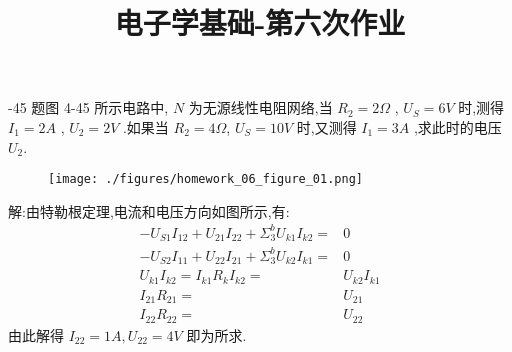 
\usepackage{../../homeworks_preamble}
\title{电子学基础-第六次作业}


    -45 题图 4-45 所示电路中, $N$ 为无源线性电阻网络,当 $R_2=2\Omega$ , $U_{S}=6V$ 时,测得 $I_{1}=2A$ , $U_2=2V$ .如果当 $R_2=4\Omega$, $U_{S}=10V$ 时,又测得 $I_1 = 3A$ ,求此时的电压 $U_2$.
    \begin{figure}[htbp]
        \centering
        \texttt{[image: ./figures/homework\_06\_figure\_01.png]}
    \end{figure}

    解:由特勒根定理,电流和电压方向如图所示,有:
    \begin{align}
        -U_{S 1}I_{12}+U_{21}I_{22}+\Sigma_{3}^{b}U_{k 1}I_{k 2}=&0\nonumber\\
        -U_{S 2}I_{11}+U_{22}I_{21}+\Sigma_{3}^{b}U_{k 2}I_{k 1}=&0\nonumber\\
        U_{k 1}I_{k 2}=I_{k 1}R_{k}I_{k 2}=&U_{k 2}I_{k 1}\nonumber\\
        I_{21}R_{21}=&U_{21}\nonumber\\
        I_{22}R_{22}=&U_{22}\nonumber
    \end{align}
    由此解得 $I_{22}=1A,U_{22}=4V$ 即为所求.

